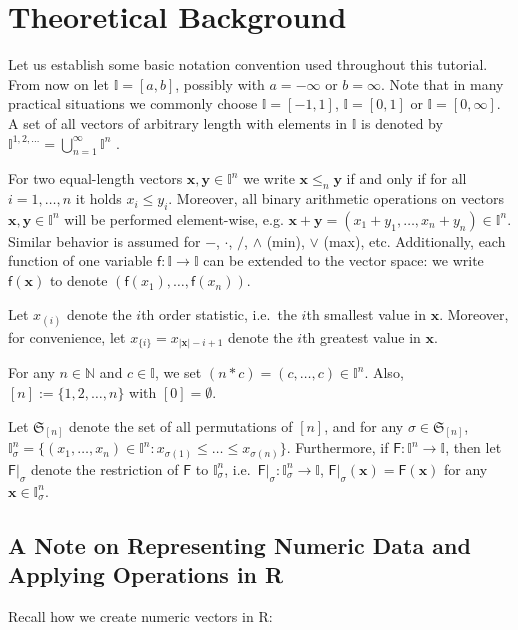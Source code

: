 \documentclass[11pt]{article}\usepackage[]{graphicx}\usepackage[]{color}
\newcommand{\lang}[1]{\textsf{#1}\xspace}
\newcommand{\R}{\lang{R}}
\newcommand{\vect}[1]{{\mathbf{#1}}}
\newcommand{\func}[1]{{\mathsf{#1}}}
\newcommand{\Ival}{\mathbb{I}}
\newcommand{\IvalPow}[1]{\mathbb{I}^{#1}}
\newcommand{\AnyPow}{^{1,2,\dots}}
\newcommand{\IvalAnyPow}{\mathbb{I}\AnyPow}
\theoremstyle{remark}
\theoremstyle{definition}
\begin{document}
\section{Theoretical Background}

Let us establish some basic notation convention
used throughout this tutorial.
From now on let $\Ival=[a,b]$, possibly with $a=-\infty$ or $b=\infty$.
Note that in many practical situations we commonly choose $\Ival=[-1,1]$,
$\Ival=[0,1]$ or $\Ival=[0,\infty]$.
A set of all vectors of arbitrary length  with elements in $\Ival$
is denoted by $\IvalAnyPow=\bigcup_{n=1}^\infty \IvalPow{n}$ .

For two equal-length vectors $\vect{x}, \vect{y}\in\IvalPow{n}$
we write $\vect{x}\le_n\vect{y}$ if and only
if for all $i=1,\dots,n$ it holds $x_i\le y_i$.
Moreover, all binary arithmetic operations on vectors
$\vect{x}, \vect{y}\in\IvalPow{n}$ will be performed element-wise,
e.g. $\vect{x}+\vect{y}=(x_1+y_1,\dots,x_n+y_n)\in\IvalPow{n}$.
Similar behavior is assumed for
$-$, $\cdot$, $/$, $\wedge$ (min), $\vee$ (max), etc.
Additionally, each function of one variable
$\func{f}:\Ival\to\Ival$ can be extended to the vector
space: we write $\func{f}(\vect{x})$ to denote
$(\func{f}(x_1), \dots, \func{f}(x_n))$.


Let $x_{(i)}$ denote the $i$th order statistic,
i.e.~the $i$th smallest value in $\vect{x}$.
Moreover, for convenience,
let $x_{\{i\}}=x_{|\vect{x}|-i+1}$ denote the $i$th greatest value in $\vect{x}$.

For any $n\in\mathbb{N}$ and $c\in\Ival$,
we set $(n\ast c) = (c,\dots,c)\in\IvalPow{n}$.
Also, $[n]:=\{1,2,\dots,n\}$ with $[0]=\emptyset$.

Let $\mathfrak{S}_{[n]}$ denote the set of all permutations of $[n]$,
and for any $\sigma\in\mathfrak{S}_{[n]}$, $\IvalPow{n}_\sigma=\{(x_1,\dots,x_n)\in\IvalPow{n}:
x_{\sigma(1)}\le\dots\le x_{\sigma(n)}\}$.
Furthermore, if $\func{F}:\IvalPow{n}\to\Ival$,
then let $\func{F}|_\sigma$ denote the restriction
of $\func{F}$ to $\IvalPow{n}_\sigma$, i.e.~$\func{F}|_\sigma:\IvalPow{n}_\sigma\to\Ival$,
$\func{F}|_\sigma(\vect{x})=\func{F}(\vect{x})$ for any $\vect{x}\in\IvalPow{n}_\sigma$.


\subsection{A Note on Representing Numeric Data and Applying Operations in \R}

Recall how we create numeric vectors in \R:
\end{document}
